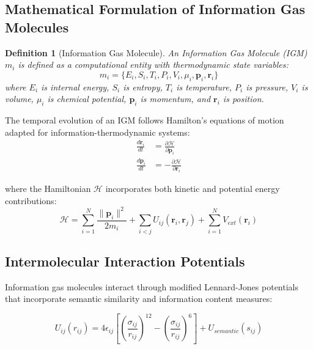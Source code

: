 \documentclass[11pt,a4paper]{article}
\newtheorem{definition}[theorem]{Definition}
\begin{document}
\subsection{Mathematical Formulation of Information Gas Molecules}

\begin{definition}[Information Gas Molecule]
An Information Gas Molecule (IGM) $m_i$ is defined as a computational entity with thermodynamic state variables:
\begin{equation}
m_i = \{E_i, S_i, T_i, P_i, V_i, \mu_i, \mathbf{p}_i, \mathbf{r}_i\}
\label{eq:igm-definition}
\end{equation}
where $E_i$ is internal energy, $S_i$ is entropy, $T_i$ is temperature, $P_i$ is pressure, $V_i$ is volume, $\mu_i$ is chemical potential, $\mathbf{p}_i$ is momentum, and $\mathbf{r}_i$ is position.
\end{definition}

The temporal evolution of an IGM follows Hamilton's equations of motion adapted for information-thermodynamic systems:
\begin{align}
\frac{d\mathbf{r}_i}{dt} &= \frac{\partial \mathcal{H}}{\partial \mathbf{p}_i} \label{eq:position-evolution} \\
\frac{d\mathbf{p}_i}{dt} &= -\frac{\partial \mathcal{H}}{\partial \mathbf{r}_i} \label{eq:momentum-evolution}
\end{align}

where the Hamiltonian $\mathcal{H}$ incorporates both kinetic and potential energy contributions:
\begin{equation}
\mathcal{H} = \sum_{i=1}^{N} \frac{\|\mathbf{p}_i\|^2}{2m_i} + \sum_{i<j} U_{ij}(\mathbf{r}_i, \mathbf{r}_j) + \sum_{i=1}^{N} V_{ext}(\mathbf{r}_i)
\label{eq:hamiltonian}
\end{equation}

\subsection{Intermolecular Interaction Potentials}

Information gas molecules interact through modified Lennard-Jones potentials that incorporate semantic similarity and information content measures:

\begin{equation}
U_{ij}(r_{ij}) = 4\epsilon_{ij}\left[\left(\frac{\sigma_{ij}}{r_{ij}}\right)^{12} - \left(\frac{\sigma_{ij}}{r_{ij}}\right)^6\right] + U_{semantic}(s_{ij})
\label{eq:interaction-potential}
\end{equation}
\end{document}
